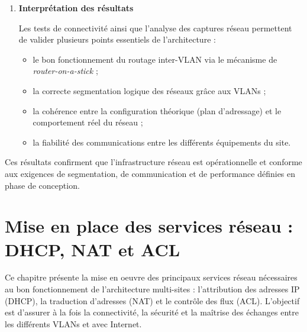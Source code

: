 \documentclass[12pt,a4paper, oneside]{memoir}
\begin{document}
\begin{enumerate}
\begin{enumerate}
\medskip

Ces observations confirment que :
\begin{itemize}
	\item le routage inter-VLAN est correctement assuré par le routeur (\textit{router-on-a-stick}) ;
	\item les communications respectent le modèle en couches (L2 pour la commutation, L3 pour le routage) ;
	\item l’infrastructure réseau est fonctionnelle et cohérente avec le plan d’adressage défini.
	\item des trames Ethernet encapsulant des balises VLAN (\texttt{802.1Q}) identifiant les réseaux logiques traversés.
\end{itemize}
\end{enumerate}

\item \textbf{Interprétation des résultats}

Les tests de connectivité ainsi que l’analyse des captures réseau permettent de valider plusieurs points essentiels de l’architecture :

\begin{itemize}
	\item le bon fonctionnement du routage inter-VLAN via le mécanisme de \textit{router-on-a-stick} ;
	\item la correcte segmentation logique des réseaux grâce aux VLANs ;
	\item la cohérence entre la configuration théorique (plan d’adressage) et le comportement réel du réseau ;
	\item la fiabilité des communications entre les différents équipements du site.
\end{itemize}
\end{enumerate}
Ces résultats confirment que l’infrastructure réseau est opérationnelle et conforme aux exigences de segmentation, de communication et de performance définies en phase de conception.


\section{Mise en place des services réseau : DHCP, NAT et ACL}
Ce chapitre présente la mise en oeuvre des principaux services réseau nécessaires au bon fonctionnement de l’architecture multi-sites : l’attribution des adresses IP (DHCP), la traduction d’adresses (NAT) et le contrôle des flux (ACL).  
L’objectif est d’assurer à la fois la connectivité, la sécurité et la maîtrise des échanges entre les différents VLANs et avec Internet.
\end{document}

